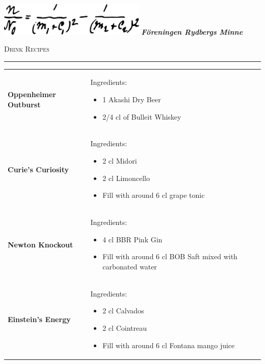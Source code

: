 \documentclass[12pt, twoside]{article}
\begin{document}
\begin{minipage}[t]{0.5\textwidth}
    \includegraphics[width=7cm]{rydberg.pdf}
    \large\textbf{\textit{Föreningen Rydbergs Minne}}
\end{minipage}
\hfill
\begin{minipage}[t]{0.4\textwidth}
    \vspace*{0mm}
    \Huge \textsc{Drink Recipes}
\end{minipage}
\rule{\textwidth}{1pt}\vspace*{5mm}

\vspace*{-1cm}
\renewcommand{\arraystretch}{3}
\begin{table}[H]
    \centering
    \begin{tabular}{p{5cm}p{\textwidth}}
        \large{\textbf{Oppenheimer \newline Outburst}} & Ingredients:
        \begin{itemize}
            \item 1 Akashi Dry Beer
            \item 2/4 cl of Bulleit Whiskey
        \end{itemize}
        \\
        \large{\textbf{Curie's Curiosity}} & Ingredients:
        \begin{itemize}
            \item 2 cl Midori
            \item 2 cl Limoncello
            \item Fill with around 6 cl grape tonic
        \end{itemize}
        \\
        \large{\textbf{Newton Knockout}} & Ingredients:
        \begin{itemize}
            \item 4 cl BBR Pink Gin
            \item Fill with around 6 cl BOB Saft mixed with carbonated water
        \end{itemize}
        \\
        \large{\textbf{Einstein's Energy}} & Ingredients:
        \begin{itemize}
            \item 2 cl Calvados
            \item 2 cl Cointreau
            \item Fill with around 6 cl Fontana mango juice
        \end{itemize}
        \\
    \end{tabular}
\end{table}
\end{document}
